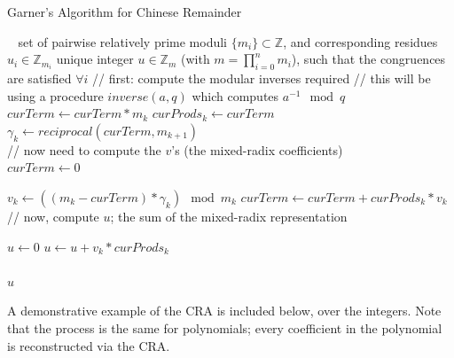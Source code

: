 \documentclass[letterpaper,12pt,titlepage,oneside,final]{book}
\begin{document}
\begin{algorithm}[H]
\caption{Garner's Algorithm for Chinese Remainder}\label{CRA}
\begin{algorithmic}[1]
\Input $\; \; $ set of pairwise relatively prime moduli ${\{m_i\} \subset \mathbb{Z}}$, and corresponding residues ${u_i \in \mathbb{Z}_{m_i}}$
\Output unique integer ${u \in \mathbb{Z}_m}$ (with ${m = \prod_{i=0}^{n}m_i}$), such that the congruences are satisfied ${\forall i}$  
\State // first: compute the modular inverses required
\State // this will be using a procedure $inverse( a, q)$ which computes ${a^{-1} \mod q}$
  \State $curTerm \gets curTerm * m_k$
  \State $curProds_k \gets curTerm$\\
  \State $\gamma_k \gets reciprocal( curTerm, m_{k+1})$
\EndFor\\

\State // now need to compute the $v$'s (the mixed-radix coefficients)\\
\State $curTerm \gets 0$

  \State $v_k \gets ((m_k - curTerm) * \gamma_k) \mod m_k$
  \State $curTerm \gets curTerm + curProds_k * v_k$
\EndFor\\

\State // now, compute $u$; the sum of the mixed-radix representation

\State $u \gets 0$
  \State $u \gets u + v_k * curProds_k$
\EndFor\\\\

\Return $u$
\EndProcedure
\end{algorithmic}
\end{algorithm} 

A demonstrative example of the CRA is included below, over the integers.  Note that the process is the same for polynomials; every coefficient in the polynomial is reconstructed via the CRA.
\end{document}
